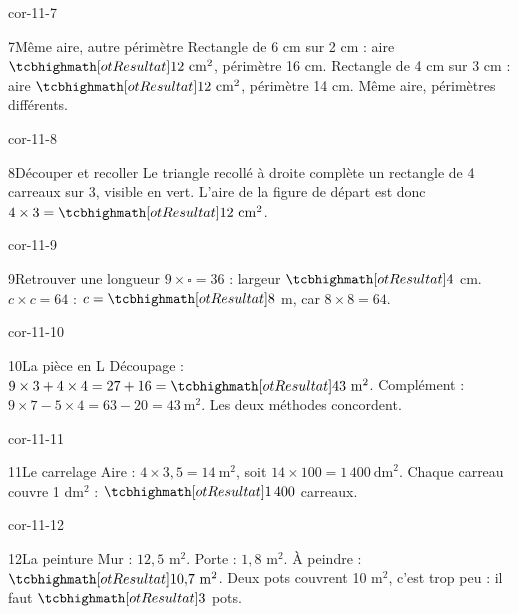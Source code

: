 \begin{blocLivre}{cor-11-7}\begin{corrige}{7}{Même aire, autre périmètre}
Rectangle de 6 cm sur 2 cm : aire $\res{12\ \mathrm{cm}^2}$, périmètre 16 cm. Rectangle de 4 cm sur 3 cm : aire $\res{12\ \mathrm{cm}^2}$, périmètre 14 cm. Même aire, périmètres différents.
\label{fig-cor-11-7}
\end{corrige}\end{blocLivre}
\begin{blocLivre}{cor-11-8}\begin{corrige}{8}{Découper et recoller}
Le triangle recollé à droite complète un rectangle de 4 carreaux sur 3, visible en vert. L’aire de la figure de départ est donc $4\times3=\res{12\ \mathrm{cm}^2}$.
\label{fig-cor-11-8}
\end{corrige}\end{blocLivre}
\begin{blocLivre}{cor-11-9}\begin{corrige}{9}{Retrouver une longueur}
$9\times\square=36$ : largeur $\res4$ cm. $c\times c=64$ : $c=\res8$ m, car $8\times8=64$.
\end{corrige}\end{blocLivre}
\begin{blocLivre}{cor-11-10}\begin{corrige}{10}{La pièce en L}
Découpage : $9\times3+4\times4=27+16=\res{43\ \mathrm{m}^2}$. Complément : $9\times7-5\times4=63-20=43\ \mathrm{m}^2$. Les deux méthodes concordent.
\label{fig-cor-11-10}
\end{corrige}\end{blocLivre}
\begin{blocLivre}{cor-11-11}\begin{corrige}{11}{Le carrelage}
Aire : $4\times3{,}5=14\ \mathrm{m}^2$, soit $14\times100=1\,400\ \mathrm{dm}^2$. Chaque carreau couvre 1 dm$^2$ : $\res{1\,400}$ carreaux.
\end{corrige}\end{blocLivre}
\begin{blocLivre}{cor-11-12}\begin{corrige}{12}{La peinture}
Mur : $12{,}5$ m$^2$. Porte : $1{,}8$ m$^2$. À peindre : $\res{10{,}7\ \mathrm{m}^2}$. Deux pots couvrent 10 m$^2$, c’est trop peu : il faut $\res3$ pots.
\end{corrige}\end{blocLivre}
